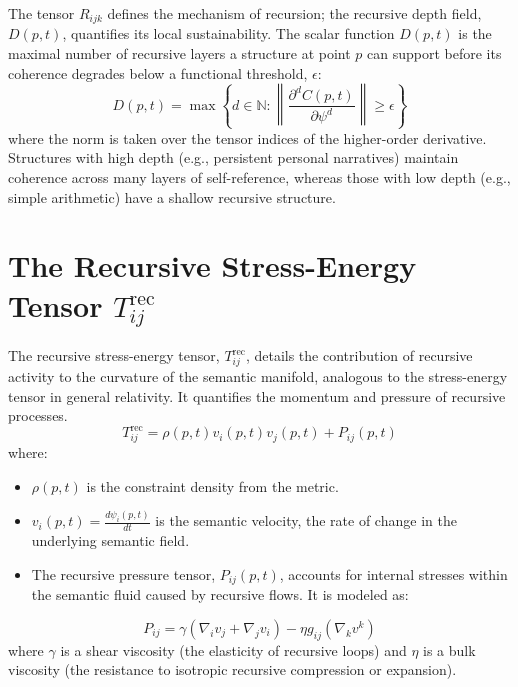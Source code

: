 The tensor \(R_{ijk}\) defines the mechanism of recursion; the recursive depth field, \(D(p, t)\), quantifies its local sustainability. The scalar function \(D(p,t)\) is the maximal number of recursive layers a structure at point \(p\) can support before its coherence degrades below a functional threshold, \(\epsilon\):
\begin{equation}
D(p, t) = \max \left\{ d \in \mathbb{N} : \left\| \frac{\partial^d C(p,t)}{\partial \psi^d} \right\| \geq \epsilon \right\}
\end{equation}
where the norm is taken over the tensor indices of the higher-order derivative. Structures with high depth (e.g., persistent personal narratives) maintain coherence across many layers of self-reference, whereas those with low depth (e.g., simple arithmetic) have a shallow recursive structure.

\section{\texorpdfstring{The Recursive Stress-Energy Tensor $T_{ij}^{\text{rec}}$}{The Recursive Stress-Energy Tensor Tij\_rec}}

The recursive stress-energy tensor, \(T_{ij}^{\text{rec}}\), details the contribution of recursive activity to the curvature of the semantic manifold, analogous to the stress-energy tensor in general relativity. It quantifies the momentum and pressure of recursive processes.
\begin{equation}
T_{ij}^{\text{rec}} = \rho(p,t) v_i(p,t) v_j(p,t) + P_{ij}(p,t)
\end{equation}
where:
\begin{itemize}
    \item \(\rho(p,t)\) is the constraint density from the metric.
    \item \(v_i(p,t) = \frac{d\psi_i(p,t)}{dt}\) is the semantic velocity, the rate of change in the underlying semantic field.
    \item The recursive pressure tensor, \(P_{ij}(p,t)\), accounts for internal stresses within the semantic fluid caused by recursive flows. It is modeled as:
\end{itemize}
\begin{equation}
P_{ij} = \gamma(\nabla_i v_j + \nabla_j v_i) - \eta g_{ij} (\nabla_k v^k)
\end{equation}
where \(\gamma\) is a shear viscosity (the elasticity of recursive loops) and \(\eta\) is a bulk viscosity (the resistance to isotropic recursive compression or expansion).